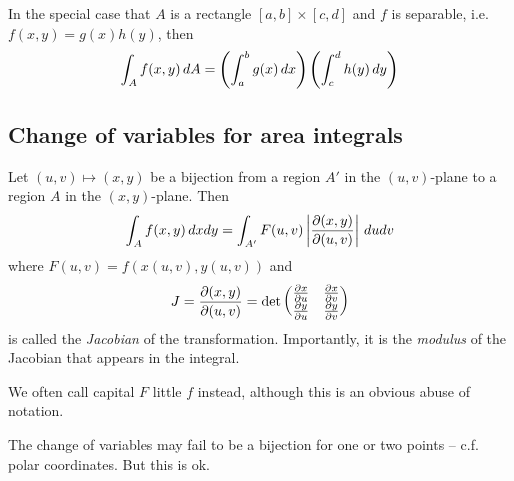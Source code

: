 \documentclass{../../template/note}
\begin{document}
    In the special case that \(A\) is a rectangle \([a, b] \times [c, d]\) and \(f\) is separable, i.e. \(f(x, y) = g(x)h(y)\), then
    \begin{align*}
        \int_A f(x, y) \,d{A} = \left(\int_a^b g(x) \,d{x}\right)\left(\int_c^d h(y) \,d{y}\right)
    \end{align*}
    
    \subsection{Change of variables for area integrals}

    \begin{proposition*}
        Let \((u, v) \mapsto (x, y)\) be a bijection from a region \(A'\) in the \((u, v)\)-plane to a region \(A\) in the \((x, y)\)-plane. Then
        \begin{align*}
            \int_A f(x, y) \D x dy = \int_{A'} F(u, v) \left|\pd{(x,y)}{(u, v)}\right| \D u dv \\
        \end{align*}
        where \(F(u, v) = f(x(u, v), y(u, v))\) and
        \begin{align*}
            J = \pd{(x,y)}{(u, v)} = \det \begin{pmatrix}
            \pd x u & \pd x v \\
            \pd y u & \pd y v \\
            \end{pmatrix}
        \end{align*}
        is called the \emph{Jacobian} of the transformation. Importantly, it is the \emph{modulus} of the Jacobian that appears in the integral.
    \end{proposition*}
    
    \begin{remark*}
        We often call capital \(F\) little \(f\) instead, although this is an obvious abuse of notation.
    \end{remark*}

    \begin{remark*}
        The change of variables may fail to be a bijection for one or two points -- c.f. polar coordinates. But this is ok.
    \end{remark*}    
    
\end{document}
